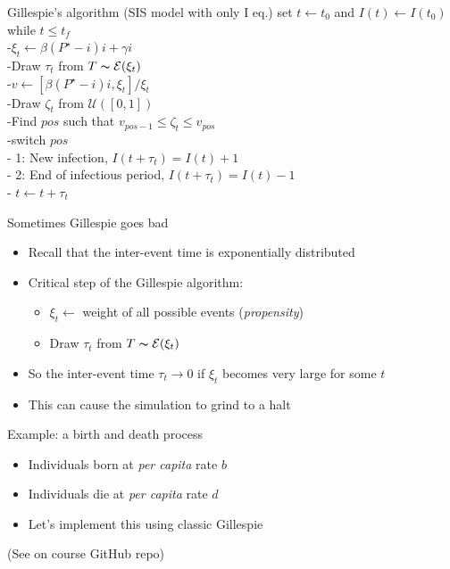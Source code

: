 \documentclass[aspectratio=169]{beamer}\usepackage[]{graphicx}\usepackage[]{xcolor}
\begin{document}
\begin{frame}{Gillespie's algorithm (SIS model with only I eq.)}
set $t\leftarrow t_0$ and $I(t)\leftarrow I(t_0)$\\
while {$t\leq t_f$}\\
-\qquad $\xi_t\leftarrow \beta (P^\star-i)i+\gamma i$\\
-\qquad Draw $\tau_t$ from $T\thicksim \mathcal{E}(\xi_t)$\\
-\qquad $v\leftarrow\left[\beta (P^\star-i)i,\xi_t\right]/\xi_t$\\
-\qquad Draw $\zeta_t$ from $\mathcal{U}([0,1])$\\
-\qquad Find $pos$ such that $v_{pos-1}\leq\zeta_t\leq v_{pos}$\\
-\qquad switch {$pos$}\\
\qquad\qquad - 1: New infection, $I(t+\tau_t)=I(t)+1$ \\
\qquad\qquad - 2: End of infectious period, $I(t+\tau_t)=I(t)-1$ \\
- $t\leftarrow t+\tau_t$
\end{frame}


\begin{frame}{Sometimes Gillespie goes bad}
    \begin{itemize}
        \item Recall that the inter-event time is exponentially distributed
        \item Critical step of the Gillespie algorithm:
        \begin{itemize}
            \item $\xi_t\leftarrow$ weight of all possible events (\emph{propensity})
            \item Draw $\tau_t$ from $T\thicksim \mathcal{E}(\xi_t)$
        \end{itemize}
        \item So the inter-event time $\tau_t\to 0$ if $\xi_t$ becomes very large for some $t$
        \item This can cause the simulation to grind to a halt
    \end{itemize}
\end{frame}


\begin{frame}{Example: a birth and death process}
    \begin{itemize}
        \item Individuals born at \emph{per capita} rate $b$
        \item Individuals die at \emph{per capita} rate $d$
        \item Let's implement this using classic Gillespie
    \end{itemize}
    \vfill
(See \href{https://raw.githubusercontent.com/julien-arino/3MC-course-epidemiological-modelling/main/CODE/simulate_birth_death_CTMC.R}{} on course GitHub repo)
\end{frame}
\end{document}
